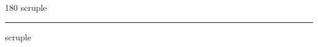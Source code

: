 
\begin{frame}
\begin{center}
\begin{turn}{180}
{\fontsize{2.5cm}{1em}\selectfont scruple}
\end{turn}
\vspace{1em}\par  
\hrule
\vspace{1em}\par  
{\fontsize{2.5cm}{1em}\selectfont scruple}
\end{center}
\end{frame}
